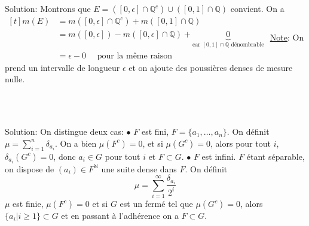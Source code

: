 \documentclass{report}
\begin{document}
Solution: Montrons que $E=\left([0,\epsilon] \cap \mathbb Q^c \right) \cup \left( [0,1] \cap \mathbb Q\right)$ convient. \newline
On a $\begin{aligned}[t] m(E) &= m([0,\epsilon] \cap \mathbb Q^c ) + m([0,1] \cap \mathbb Q) \\ &= m([0,\epsilon]) - m([0,\epsilon] \cap \mathbb Q) + \underbrace{0}_{\text{car $[0,1] \cap \mathbb Q$  dénombrable}} \\ &= \epsilon - 0 \quad \text{ pour la même raison}   \end{aligned}$
\newline \newline
\underline{Note}: On prend un intervalle de longueur $\epsilon$ et on ajoute des poussières denses de mesure nulle.

\subsection{} \\\\

Solution: On distingue deux cas: \newline
$\bullet$ $F$ est fini, $F=\{a_1, \ldots, a_n\}$. On définit $\mu = \sum_{i=1}^n \delta_{a_i}$. On a bien $\mu(F^c)=0$, et si $\mu(G^c)=0$, alors pour tout $i$, $\delta_{a_i}(G^c)=0$, donc $a_i\in G$ pour tout $i$ et $F\subset G$. \newline
$\bullet$ $F$ est infini. $F$ étant séparable, on dispose de $(a_i)\in F^{\mathbb N}$ une suite dense dans $F$. On définit $$\mu = \sum_{i=1}^\infty \frac{\delta_{a_i}}{2^i} $$ \newline
$\mu$ est finie, $\mu(F^c)=0$ et si $G$ est un fermé tel que $\mu(G^c)=0$, alors $\{a_i | i\geq 1\} \subset G$ et en passant à l'adhérence on a $F\subset G$.



\subsection{} 


\subsection{} \\ \\
\end{document}
